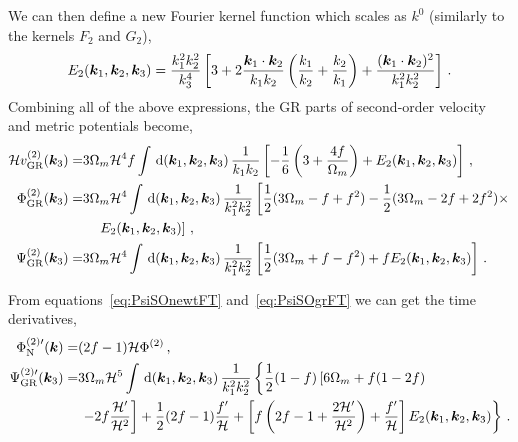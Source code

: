 We can then define a new Fourier kernel function which scales as $k^0$ (similarly to the kernels $F_2$ and $G_2$), 
\begin{equation}
	E_2(\bm {k}_1,\bm {k}_2,\bm {k}_3) = \frac{k_1^2 k_2^2}{k_3^4} \left[ 3 + 2\frac{\bm {k}_1\cdot\bm {k}_2}{k_1 k_2} \left( \frac{k_1}{k_2} + \frac{k_2}{k_1} \right) + \frac{(\bm {k}_1 \cdot \bm {k}_2)^2}{k_1^2 k_2^2} \right]\,.
\end{equation}
Combining all of the above expressions, the GR parts of second-order velocity and metric potentials become, 
\begin{align}
	\mathcal{H} v^{(2)}_{\mathrm{GR}}(\bm {k}_3) =& 3 \Omega_m \mathcal{H}^4 f \int \,\mathrm{d}(\bm {k}_1,\bm {k}_2,\bm {k}_3)\, \frac{1}{k_1 k_2} \left[ - \frac{1}{6} \left( 3 + \frac{4 f}{\Omega_m} \right) + E_2(\bm {k}_1,\bm {k}_2,\bm {k}_3) \right]\,,\\
	\Phi_{\mathrm{GR}}^{(2)}(\bm {k}_3) =& 3 \Omega_m \mathcal{H}^4 \int \,\mathrm{d}(\bm {k}_1,\bm {k}_2,\bm {k}_3)\, \frac{1}{k_1^2 k_2^2} \left[ \frac{1}{2} (3 \Omega_m - f + f^2)  - \frac{1}{2}(3 \Omega_m - 2f + 2 f^2)\times\right.\nonumber\\
	&\left. \quad E_2(\bm {k}_1,\bm {k}_2,\bm {k}_3) \right]\,,\\
	\Psi_{\mathrm{GR}}^{(2)}(\bm {k}_3) =& 3 \Omega_m \mathcal{H}^4 \int \,\mathrm{d}(\bm {k}_1,\bm {k}_2,\bm {k}_3)\, \frac{1}{k_1^2 k_2^2} \left[ \frac{1}{2} (3 \Omega_m + f - f^2) + f E_2(\bm {k}_1,\bm {k}_2,\bm {k}_3) \right]\,.\label{eq:PsiSOgrFT}
\end{align}

From equations~\eqref{eq:PsiSOnewtFT} and~\eqref{eq:PsiSOgrFT} we can get the time derivatives, 
\begin{align}
	\Phi_{\mathrm{N}}^{{(2)}\prime}(\bm {k}) =& (2 f - 1) \mathcal{H} \Phi^{(2)}\,,\\
	\Psi_{\mathrm{GR}}^{{(2)}\prime}(\bm {k}_3) =& 3 \Omega_m \mathcal{H}^5 \int \,\mathrm{d}(\bm {k}_1,\bm {k}_2,\bm {k}_3)\, \frac{1}{k_1^2 k_2^2} \left\{ \frac{1}{2}(1-f) \left[ 6 \Omega_m + f(1-2f) \right. \right. \nonumber \\
	&\left. \left. -2f \frac{\mathcal{H}'}{\mathcal{H}^2} \right] + \frac{1}{2}(2f-1) \frac{f'}{\mathcal{H}} + \left[ f \left( 2f - 1 + \frac{2\mathcal{H}'}{\mathcal{H}^2} \right) + \frac{f'}{\mathcal{H}} \right] E_2(\bm {k}_1,\bm {k}_2,\bm {k}_3) \right\}\,.
\end{align}


